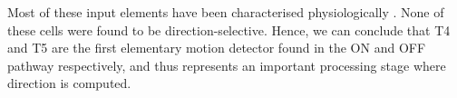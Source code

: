 Most of these input elements have been characterised physiologically \parencite{Arenz2017, Serbe2016, Strother2017, Meier2019, Borst2020}. None of these cells were found to be direction-selective. Hence, we can conclude that T4 and T5 are the first elementary motion detector found in the ON and OFF pathway respectively, and thus represents an important processing stage where direction is computed.    






